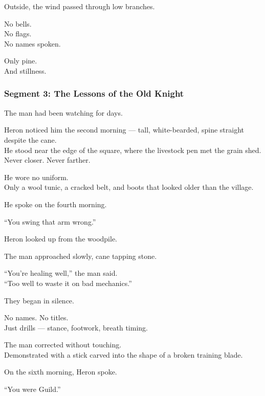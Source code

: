 \documentclass[9pt]{article}
\begin{document}
\vspace{1em}

Outside, the wind passed through low branches.

No bells.\\
No flags.\\
No names spoken.

Only pine.\\
And stillness.

\newpage

\subsubsection*{Segment 3: The Lessons of the Old Knight}

The man had been watching for days.

Heron noticed him the second morning — tall, white-bearded, spine straight despite the cane.\\
He stood near the edge of the square, where the livestock pen met the grain shed.\\
Never closer. Never farther.

He wore no uniform.\\
Only a wool tunic, a cracked belt, and boots that looked older than the village.

He spoke on the fourth morning.

\vspace{1em}

“You swing that arm wrong.”

Heron looked up from the woodpile.

The man approached slowly, cane tapping stone.

“You're healing well,” the man said.\\
“Too well to waste it on bad mechanics.”

\vspace{1em}

They began in silence.

No names. No titles.\\
Just drills — stance, footwork, breath timing.

The man corrected without touching.\\
Demonstrated with a stick carved into the shape of a broken training blade.

\vspace{1em}

On the sixth morning, Heron spoke.

“You were Guild.”
\end{document}
